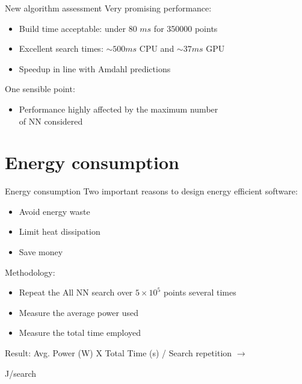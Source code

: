 \documentclass{beamer}
\begin{document}
\begin{frame}{New algorithm assessment}
Very promising performance:
\begin{itemize}
\item Build time acceptable: under 80 $\unit{ms}$ for 350000 points
\vspace{3mm}
\item Excellent search times: $\sim 500 \unit{ms}$ CPU and $\sim 37 \unit{ms}$ GPU
\vspace{3mm}
\item Speedup in line with Amdahl predictions
\end{itemize}
\vspace{5mm}
One sensible point:
\begin{itemize}
\item Performance highly affected by the maximum number\\ of NN considered
\end{itemize}
\end{frame}

\section{Energy consumption}

\begin{frame}{Energy consumption}
Two important reasons to design energy efficient software:
\begin{itemize}
\item Avoid energy waste
\item Limit heat dissipation
\item Save money
\end{itemize}
\vspace{5mm}
Methodology:
\begin{itemize}
\item Repeat the All NN search over $5 \times 10^5$ points several times
\item Measure the average power used
\item Measure the total time employed
\end{itemize}
\vspace{1mm}
Result: Avg. Power (W) X Total Time (s) / Search repetition $\rightarrow$\\
\vspace{2mm}
\begin{center}
J/search
\end{center}
\end{frame}
\end{document}
